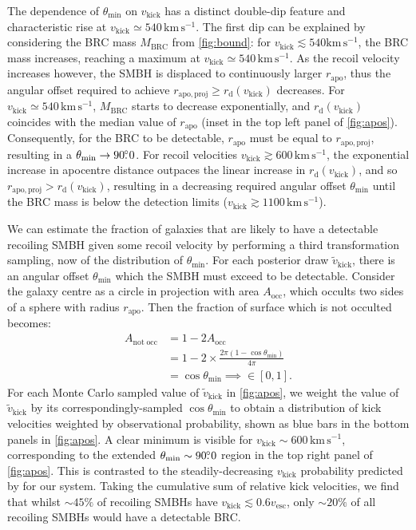\documentclass[twocolumn]{aastex631}
\newcommand{\kmps}{\ensuremath{\mathrm{km}\,\mathrm{s}^{-1}} }%
\newcommand{\rapo}{\ensuremath{r_\mathrm{apo}}}               %
\newcommand{\rapop}{\ensuremath{r_\mathrm{apo,proj}}}         %
\newcommand{\vk}{\ensuremath{v_\mathrm{kick}}}                %
\newcommand{\rdetect}{\ensuremath{r_\mathrm{d}(\vk)}}         %
\newcommand{\mbound}{\ensuremath{M_\mathrm{BRC}}}           %
\begin{document}
The dependence of $ \theta_\mathrm{min}$ on $\vk$ has a distinct double-dip feature and characteristic rise at $\vk\simeq 540\,\kmps$.
The first dip can be explained by considering the BRC mass $\mbound$ from \autoref{fig:bound}: for $\vk\lesssim 540\kmps$, the BRC mass increases, reaching a maximum at $\vk\simeq540\,\kmps$.
As the recoil velocity increases however, the SMBH is displaced to continuously larger $\rapo$, thus the angular offset required to achieve $\rapop \geq \rdetect$ decreases.
For $\vk\simeq 540\,\kmps$, $\mbound$ starts to decrease exponentially, and $\rdetect$ coincides with the median value of $\rapo$ (inset in the top left panel of \autoref{fig:apos}).
Consequently, for the BRC to be detectable, $\rapo$ must be equal to $\rapop$, resulting in a $\theta_\mathrm{min} \rightarrow 90\mbox{$.\!\!^\circ$}0$.
For recoil velocities $\vk\gtrsim 600\,\kmps$, the exponential increase in apocentre distance outpaces the linear increase in $\rdetect$, and so $\rapop>\rdetect$, resulting in a decreasing required angular offset $\theta_\mathrm{min}$ until the BRC mass is below the detection limits ($\vk\gtrsim1100\,\kmps$). 

We can estimate the fraction of galaxies that are likely to have a detectable recoiling SMBH given some recoil velocity by performing a third transformation sampling, now of the distribution of $\theta_\mathrm{min}$.
For each posterior draw $\tilde{v}_\mathrm{kick}$, there is an angular offset $\theta_\mathrm{min}$ which the SMBH must exceed to be detectable. 
Consider the galaxy centre as a circle in projection with area $A_\mathrm{occ}$, which occults two sides of a sphere with radius $\rapo$.
Then the fraction of surface which is not occulted becomes:
\begin{align*}
    A_\mathrm{not\;occ} &= 1 - 2A_\mathrm{occ} \\
    &= 1 - 2 \times \frac{2\pi(1-\cos\theta_\mathrm{min})}{4\pi} \\
    &= \cos\theta_\mathrm{min} \implies \in [0, 1].
\end{align*}
For each Monte Carlo sampled value of $\tilde{v}_\mathrm{kick}$ in \autoref{fig:apos}, we weight the value of $\tilde{v}_\mathrm{kick}$ by its correspondingly-sampled $\cos\theta_\mathrm{min}$ to obtain a distribution of kick velocities weighted by observational probability, shown as blue bars in the bottom panels in \autoref{fig:apos}.
A clear minimum is visible for $\vk\sim600\,\kmps$, corresponding to the extended $\theta_\mathrm{min}\sim90\mbox{$.\!\!^\circ$}0$ region in the top right panel of \autoref{fig:apos}.
This is contrasted to the steadily-decreasing $\vk$ probability predicted by \citet{zlochower2015} for our system.
Taking the cumulative sum of relative kick velocities, we find that whilst $\sim45\%$ of recoiling SMBHs have $\vk\lesssim0.6v_\mathrm{esc}$, only $\sim20\%$ of all recoiling SMBHs would have a detectable BRC.
\end{document}
